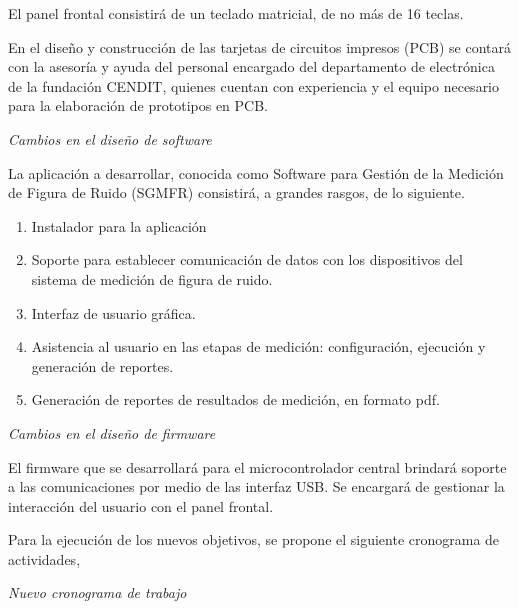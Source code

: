 \documentclass[paper=letter,oneside,fontsize=12pt, parskip=full]{article}
\begin{document}
	El panel frontal consistirá de un teclado matricial, de no más de 16 teclas. 
	
	En el diseño y construcción de las tarjetas de circuitos impresos (PCB) se contará con la asesoría y ayuda del personal encargado del departamento de electrónica de la fundación CENDIT, quienes cuentan con experiencia y el equipo necesario para la elaboración de prototipos en PCB.
	
	\emph{Cambios en el diseño de software}
	
	La aplicación a desarrollar, conocida como Software para Gestión de la Medición de Figura de Ruido (SGMFR) consistirá, a grandes rasgos, de lo siguiente.
	
	\begin{enumerate}
		\item Instalador para la aplicación
		\item Soporte para establecer comunicación de datos con los dispositivos del sistema de medición de figura de ruido.
		\item Interfaz de usuario gráfica.
		\item Asistencia al usuario en las etapas de medición: configuración, ejecución y generación de reportes.
		\item Generación de reportes de resultados de medición, en formato pdf.
	\end{enumerate}

	\emph{Cambios en el diseño de firmware}
	
	El firmware que se desarrollará para el microcontrolador central brindará soporte a las comunicaciones por medio de las interfaz USB. Se encargará de gestionar la interacción del usuario con el panel frontal. 	
	
	Para la ejecución de los nuevos objetivos, se propone el siguiente cronograma de actividades,
	
	\emph{Nuevo cronograma de trabajo}
\end{document}
